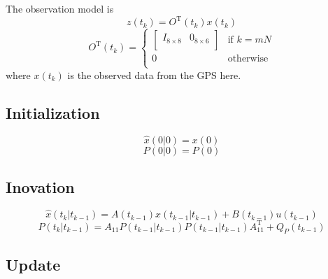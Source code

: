 \documentclass[a4paper]{report}
\numberwithin{equation}{chapter}
\begin{document}
\bigskip

The observation model is
\begin{equation}
z \left( t_k \right) = O^{\mathrm{T}} \left( t_k \right) x \left( t_k \right)
\end{equation}
\begin{equation}
O^{\mathrm{T}} \left( t_k \right) =
\begin{cases}
\begin{bmatrix}
I_{8 \times 8} & 0_{8 \times 6}\\
\end{bmatrix} & \text{if $k = mN$}\\
0 & \text{otherwise}\\
\end{cases}
\end{equation}
where $x \left( t_k \right)$ is the observed data from the GPS here.

\subsection[Initialization]{Initialization}

\begin{equation}
\hat{x} \left( 0 | 0 \right) = x \left( 0 \right)
\end{equation}
\begin{equation}
P \left( 0 | 0 \right) = P \left( 0 \right)
\end{equation}

\subsection[Inovation]{Inovation}

\begin{equation}
\hat{x} \left( t_k | t_{k - 1} \right) = A \left( t_{k - 1} \right) \hat{x} \left( t_{k - 1} | t_{k - 1} \right) + B \left( t_{k - 1} \right) u \left( t_{k - 1} \right)
\end{equation}
\begin{equation}
P \left( t_k | t_{k - 1} \right) = A_{11} P \left( t_{k - 1} | t_{k - 1} \right) P \left( t_{k - 1} | t_{k - 1} \right) A^{\mathrm{T}}_{11} + Q_P \left( t_{k - 1} \right)
\end{equation}

\subsection[Update]{Update}
\end{document}
